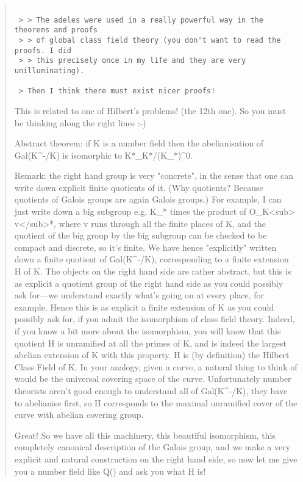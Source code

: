 \begin{quote}

\begin{verbatim}

 > > The adeles were used in a really powerful way in the theorems and proofs
 > > of global class field theory (you don't want to read the proofs. I did
 > > this precisely once in my life and they are very unilluminating).

 > Then I think there must exist nicer proofs!
\end{verbatim}
    

 This is related to one of Hilbert's problems! (the 12th one). So you must
 be thinking along the right lines :-)

 Abstract theorem: if K is a number field then the abelianisation of
 Gal(K^{-}/K) is isomorphic to K*\Adeles_{K}*/(K_{\infty }*)^{0}.

 Remark: the right hand group is very "concrete", 
 in the sense that one can
 write down explicit finite quotients of it. (Why quotients? Because quotients
 of Galois groups are again Galois groups.) For example, I can
 just write down a big subgroup e.g. K_{\infty }* times the product of
 O_{K<sub> v}</sub>*, where v runs through all the finite places of K, and the
 quotient of the big group by the big subgroup can be checked to be compact
 and discrete, so it's finite. We have hence "explicitly" written down a
 finite quotient of Gal(K^{-}/K), corresponding to a finite extension H of K.
 The objects on the right hand side are rather abstract, but this is as
 explicit a quotient group of the right hand side as you could possibly ask for---we
 understand exactly what's going on at every place, for example. Hence this
 is as explicit a finite extension of K as you could possibly ask for, if
 you admit the isomorphism of class field theory. Indeed, if you know a bit
 more about the isomorphism, you will know that this quotient H is
 unramified at all the primes of K, and is indeed the largest
 abelian extension of K with this property. H is (by definition) the
 Hilbert Class Field of K. In your analogy, given a curve, a natural thing
 to think of would be the universal covering space of the curve.
 Unfortunately number theorists aren't good enough to understand all of
 Gal(K^{-}/K), they have to abelianise first, so H corresponds to the
 maximal unramified cover of the curve with abelian covering group.
 
 Great! So we have all this machinery, this beautiful isomorphism, this
 completely canonical description of the Galois group, and we make a very
 explicit and natural construction on the right hand side, so now let me
 give you a number field like Q() and ask you what H is!


\end{quote}

